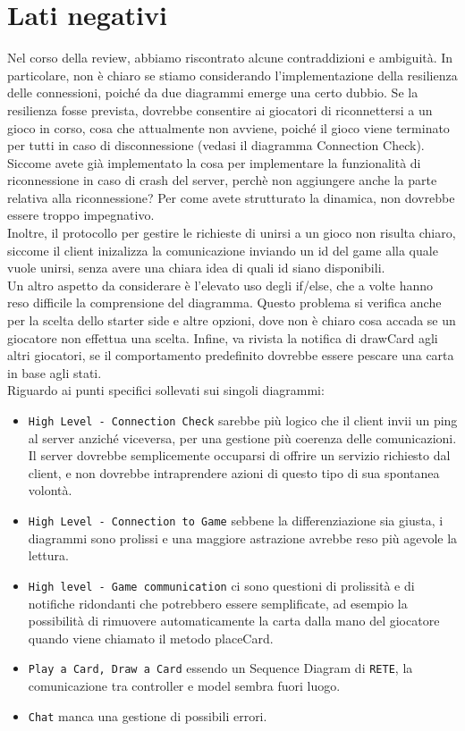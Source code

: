 \documentclass[12pt]{article}
\begin{document}
\section{Lati negativi}
Nel corso della review, abbiamo riscontrato alcune contraddizioni e ambiguità. In particolare, non è chiaro se stiamo considerando l'implementazione della resilienza delle connessioni, poiché da due diagrammi emerge una certo dubbio. Se la resilienza fosse prevista, dovrebbe consentire ai giocatori di riconnettersi a un gioco in corso, cosa che attualmente non avviene, poiché il gioco viene terminato per tutti in caso di disconnessione (vedasi il diagramma Connection Check). Siccome avete già implementato la cosa per implementare la funzionalità di riconnessione in caso di crash del server, perchè non aggiungere anche la parte relativa alla riconnessione? Per come avete strutturato la dinamica, non dovrebbe essere troppo impegnativo. \\
Inoltre, il protocollo per gestire le richieste di unirsi a un gioco non risulta chiaro, siccome il client inizalizza la comunicazione inviando un id del game alla quale vuole unirsi, senza avere una chiara idea di quali id siano disponibili.\\
Un altro aspetto da considerare è l'elevato uso degli if/else, che a volte hanno reso difficile la comprensione del diagramma. Questo problema si verifica anche per la scelta dello starter side e altre opzioni, dove non è chiaro cosa accada se un giocatore non effettua una scelta. Infine, va rivista la notifica di drawCard agli altri giocatori, se il comportamento predefinito dovrebbe essere pescare una carta in base agli stati.\\
Riguardo ai punti specifici sollevati sui singoli diagrammi:
\begin{itemize}
    \item \texttt{High Level - Connection Check} sarebbe più logico che il client invii un ping al server anziché viceversa, per una gestione più coerenza delle comunicazioni. Il server dovrebbe semplicemente occuparsi di offrire un servizio richiesto dal client, e non dovrebbe intraprendere azioni di questo tipo di sua spontanea volontà.
    \item \texttt{High Level - Connection to Game} sebbene la differenziazione sia giusta, i diagrammi sono prolissi e una maggiore astrazione avrebbe reso più agevole la lettura.
    \item \texttt{High level - Game communication} ci sono questioni di prolissità e di notifiche ridondanti che potrebbero essere semplificate, ad esempio la possibilità di rimuovere automaticamente la carta dalla mano del giocatore quando viene chiamato il metodo placeCard.
    \item \texttt{Play a Card, Draw a Card} essendo un Sequence Diagram di \texttt{RETE}, la comunicazione tra controller e model sembra fuori luogo.
    \item \texttt{Chat} manca una gestione di possibili errori.
\end{itemize}
\end{document}
